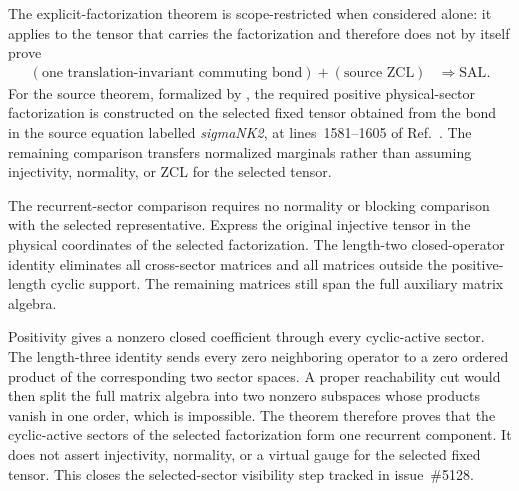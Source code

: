 \documentclass{article}
\begin{document}
The explicit-factorization theorem
 is
scope-restricted when considered alone: it applies to the tensor that carries
the factorization and therefore does not by itself prove
\begin{align}
    (\text{one translation-invariant commuting bond})
        +(\text{source ZCL})
        &\Longrightarrow
        \text{SAL}.
    \label{eq:cpsv16_commuting_form_to_sal_source_implication}
\end{align}
For the source theorem, formalized by
, the required
positive physical-sector factorization is constructed on the selected fixed
tensor obtained from the bond in the source equation labelled
\emph{sigmaNK2}, at lines~1581--1605 of
Ref.~\cite{Cirac2016MPDO_arXiv}. The remaining comparison transfers normalized
marginals rather than assuming injectivity, normality, or ZCL for the selected
tensor.

The recurrent-sector comparison requires no normality or blocking comparison
with the selected representative. Express the original injective tensor in
the physical coordinates of the selected factorization. The length-two
closed-operator identity eliminates all cross-sector matrices and all matrices
outside the positive-length cyclic support. The remaining matrices still span
the full auxiliary matrix algebra.

Positivity gives a nonzero closed coefficient through every cyclic-active
sector. The length-three identity sends every zero neighboring operator to a
zero ordered product of the corresponding two sector spaces. A proper
reachability cut would then split the full matrix algebra into two nonzero
subspaces whose products vanish in one order, which is impossible. The theorem
therefore proves that the cyclic-active sectors of the selected factorization
form one recurrent component. It does not assert injectivity, normality, or a
virtual gauge for the selected fixed tensor. This closes the selected-sector
visibility step tracked in issue~\#5128.
\end{document}
